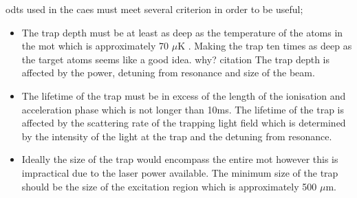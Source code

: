 \Glspl{odt} used in the \gls{caes} must meet several criterion in order to be useful;
\begin{itemize}
    \item The trap depth must be at least as deep as the temperature of the atoms in the \gls{mot} which is approximately 70 $\mu$K \cite{mcculloch_arbitrarily_2011}. Making the trap ten times as deep as the target atoms seems like a good idea. {\color{red} why? citation} The trap depth is affected by the power, detuning from resonance and size of the beam.
    \item The lifetime of the trap must be in excess of the length of the  ionisation and acceleration phase which is not longer than 10ms. The lifetime of the trap is affected by the scattering rate of the trapping light field which is determined by the intensity of the light at the trap and the detuning from resonance.
    \item Ideally the size of the trap would encompass the entire \gls{mot} however this is impractical due to the laser power available. The minimum size of the trap should be the size of the excitation region which is approximately 500 $\mu$m\cite{mcculloch_electron_2012}.
\end{itemize}

